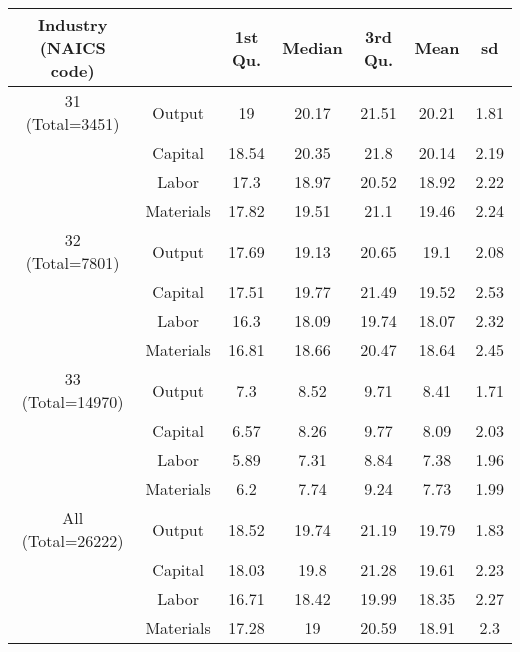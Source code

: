 \begin{table}[H]
\centering
\begin{tabular}{ccccccc}
  \hline\hline Industry (NAICS code) &   & 1st Qu. & Median & 3rd Qu. & Mean & sd \\ 
  \hline
31 (Total=3451) & Output & 19 & 20.17 & 21.51 & 20.21 & 1.81 \\ 
   & Capital & 18.54 & 20.35 & 21.8 & 20.14 & 2.19 \\ 
   & Labor & 17.3 & 18.97 & 20.52 & 18.92 & 2.22 \\ 
   & Materials & 17.82 & 19.51 & 21.1 & 19.46 & 2.24 \\ 
  32 (Total=7801) & Output & 17.69 & 19.13 & 20.65 & 19.1 & 2.08 \\ 
   & Capital & 17.51 & 19.77 & 21.49 & 19.52 & 2.53 \\ 
   & Labor & 16.3 & 18.09 & 19.74 & 18.07 & 2.32 \\ 
   & Materials & 16.81 & 18.66 & 20.47 & 18.64 & 2.45 \\ 
  33 (Total=14970) & Output & 7.3 & 8.52 & 9.71 & 8.41 & 1.71 \\ 
   & Capital & 6.57 & 8.26 & 9.77 & 8.09 & 2.03 \\ 
   & Labor & 5.89 & 7.31 & 8.84 & 7.38 & 1.96 \\ 
   & Materials & 6.2 & 7.74 & 9.24 & 7.73 & 1.99 \\ 
  All (Total=26222) & Output & 18.52 & 19.74 & 21.19 & 19.79 & 1.83 \\ 
   & Capital & 18.03 & 19.8 & 21.28 & 19.61 & 2.23 \\ 
   & Labor & 16.71 & 18.42 & 19.99 & 18.35 & 2.27 \\ 
   & Materials & 17.28 & 19 & 20.59 & 18.91 & 2.3 \\ 
   \hline
\end{tabular}
\end{table}
